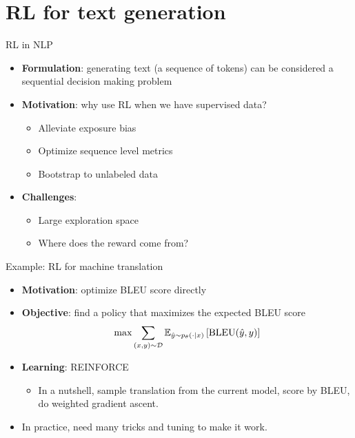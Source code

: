 \documentclass[usenames,dvipsnames,notes,11pt,aspectratio=169,hyperref={colorlinks=true, linkcolor=blue}]{beamer}
\begin{document}
\section{RL for text generation}

\begin{frame}{RL in NLP}{}
    \begin{itemize}
        \itemsep1em
        \item {\bf Formulation}: generating text (a sequence of tokens) can be considered a sequential decision making problem
        \item {\bf Motivation}: why use RL when we have supervised data?
            \pause
            \begin{itemize}
                \item Alleviate exposure bias
                \item Optimize sequence level metrics
                \item Bootstrap to unlabeled data
            \end{itemize}
        \item {\bf Challenges}:\pause
            \begin{itemize}
                \item Large exploration space
                \item Where does the reward come from?
            \end{itemize}
    \end{itemize}
\end{frame}

\begin{frame}{Example: RL for machine translation}{}
    \begin{itemize}
        \itemsep1em
        \item {\bf Motivation}: optimize BLEU score directly
        \item {\bf Objective}: find a policy that maximizes the expected BLEU score
            $$
            \max \sum_{(x,y)\sim \mathcal{D}}\mathbb{E}_{\hat{y}\sim p_\theta(\cdot\mid x)}\left[ \text{BLEU}(\hat{y},y) \right]
            $$
        \item {\bf Learning}: REINFORCE
            \begin{itemize}
                \item In a nutshell, sample translation from the current model, score by BLEU, do weighted gradient ascent.
            \end{itemize}
        \item In practice, need many tricks and tuning to make it work. 
    \end{itemize}
\end{frame}
\end{document}
